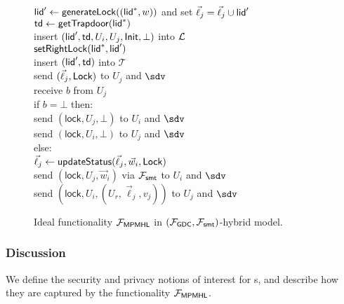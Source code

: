 \begin{figure*}[!h]
{\begin{minipage}[t]{0.45\textwidth}
{				\quad $\mathsf{lid}' \gets \mathsf{generateLock}((\mathsf{lid}^*,w))$ and set $\vec{\ell}_j = \vec{\ell}_j \cup \mathsf{lid}'$													\\
				\quad $\mathsf{td} \gets \mathsf{getTrapdoor}(\mathsf{lid}^*)$								\\
				\quad insert $(\mathsf{lid}', \mathsf{td}, U_i, U_j, \mathsf{Init}, \bot)$ into $\mathcal{L}$				\\
				\quad $\mathsf{setRightLock}(\mathsf{lid}^*, \mathsf{lid}')$											\\
				\quad insert $(\mathsf{lid}',\mathsf{td})$ into $\mathcal{T}$								\\
				send $(\vec{\ell}_j, \mathsf{Lock})$ to $U_j$ and $\sdv$								\\
				receive $b$ from $U_j$														\\
				if $b = \bot$ then: 															\\
				\quad send $(\mathsf{lock},U_j,\bot)$ to $U_i$ and $\sdv$					\\
				\quad send $(\mathsf{lock},U_i,\bot)$ to $U_j$ and $\sdv$					\\	
				else:																		\\
				\quad $\vec{\ell}_j \gets \mathsf{updateStatus}(\vec{\ell}_j, \vec{w}_i, \mathsf{Lock})$	\\
				\quad send $(\mathsf{lock},U_j,\vec{w}_i)$ via $\mathcal{F}_{\mathsf{smt}}$ to $U_i$ 
				and $\sdv$																	\\
				\quad send $(\mathsf{lock},U_i,(U_r,\vec{\ell}_j,v_j))$ to $U_j$ and $\sdv$
			}
			\\
		\end{minipage}
	}
	
	\caption{Ideal functionality $\mathcal{F}_{\mathsf{MPMHL}}$ in $(\mathcal{F}_{\mathsf{GDC}}, \mathcal{F}_{\mathsf{smt}})$-hybrid model.}
	\label{fig:ideal-mpmhl}
\end{figure*}


\subsubsection{Discussion}
\label{sec:mpmhl-discussion}

We define the security and privacy notions of interest for {\sysname}s, and describe how they 
are captured by the functionality $\mathcal{F}_{\mathsf{MPMHL}}$.

